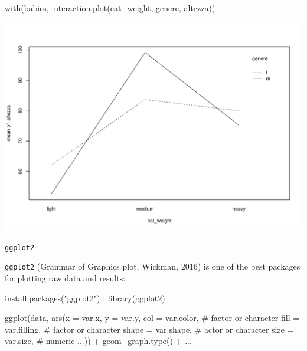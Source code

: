 \documentclass[
  ignorenonframetext,
]{beamer}
\newenvironment{Shaded}{\begin{snugshade}}{\end{snugshade}}
\newcommand{\AttributeTok}[1]{\textcolor[rgb]{0.00,0.34,0.68}{#1}}
\newcommand{\CommentTok}[1]{\textcolor[rgb]{0.54,0.53,0.53}{#1}}
\newcommand{\FunctionTok}[1]{\textcolor[rgb]{0.39,0.29,0.61}{#1}}
\newcommand{\NormalTok}[1]{\textcolor[rgb]{0.12,0.11,0.11}{#1}}
\newcommand{\SpecialCharTok}[1]{\textcolor[rgb]{0.24,0.68,0.91}{#1}}
\newcommand{\StringTok}[1]{\textcolor[rgb]{0.75,0.01,0.01}{#1}}
\begin{document}
\begin{frame}[fragile]{}
\protect\hypertarget{section-6}{}
\begin{Shaded}
\begin{Highlighting}[]
\FunctionTok{with}\NormalTok{(babies, }
     \FunctionTok{interaction.plot}\NormalTok{(cat\_weight, genere, altezza))}
\end{Highlighting}
\end{Shaded}

\begin{center}\includegraphics[width=0.7\linewidth]{Practice_files/figure-beamer/unnamed-chunk-57-1} \end{center}
\end{frame}

\begin{frame}[fragile]{\texttt{ggplot2}}
\protect\hypertarget{ggplot2}{}
\small

\texttt{ggplot2} (Grammar of Graphics plot, Wickman, 2016) is one of the
best packages for plotting raw data and results:

\begin{Shaded}
\begin{Highlighting}[]
\FunctionTok{install.packages}\NormalTok{(}\StringTok{"ggplot2"}\NormalTok{) ; }\FunctionTok{library}\NormalTok{(ggplot2)}
\end{Highlighting}
\end{Shaded}

\begin{Shaded}
\begin{Highlighting}[]
\FunctionTok{ggplot}\NormalTok{(data, }
       \FunctionTok{ars}\NormalTok{(}\AttributeTok{x =}\NormalTok{ var.x, }
           \AttributeTok{y =}\NormalTok{ var.y, }
           \AttributeTok{col =}\NormalTok{ var.color, }\CommentTok{\# factor or character}
           \AttributeTok{fill =}\NormalTok{  var.filling, }\CommentTok{\# factor or character}
           \AttributeTok{shape =}\NormalTok{  var.shape, }\CommentTok{\# actor or character }
           \AttributeTok{size =}\NormalTok{ var.size,  }\CommentTok{\# numeric}
\NormalTok{           ...)) }\SpecialCharTok{+} \FunctionTok{geom\_graph.type}\NormalTok{() }\SpecialCharTok{+}\NormalTok{ ...}
\end{Highlighting}
\end{Shaded}
\end{frame}
\end{document}
